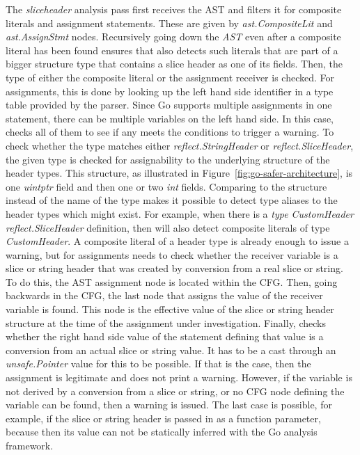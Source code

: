 The \textit{sliceheader} analysis pass first receives the \acrshort{AST} and filters it for composite literals and
assignment statements.
These are given by \textit{ast.CompositeLit} and \textit{ast.AssignStmt} nodes.
Recursively going down the \textit{AST} even after a composite literal has been found ensures that \toolSafer{} also
detects such literals that are part of a bigger structure type that contains a slice header as one of its fields.
Then, the type of either the composite literal or the assignment receiver is checked.
For assignments, this is done by looking up the left hand side identifier in a type table provided by the parser.
Since Go supports multiple assignments in one statement, there can be multiple variables on the left hand side.
In this case, \toolSafer{} checks all of them to see if any meets the conditions to trigger a warning.
To check whether the type matches either \textit{reflect.StringHeader} or \textit{reflect.SliceHeader}, the given type
is checked for assignability to the underlying structure of the header types.
This structure, as illustrated in Figure~\ref{fig:go-safer-architecture}, is one \textit{uintptr} field and then one
or two \textit{int} fields.
Comparing to the structure instead of the name of the type makes it possible to detect type aliases to the header types
which might exist.
For example, when there is a \textit{type CustomHeader reflect.SliceHeader} definition, then \toolSafer{} will also
detect composite literals of type \textit{CustomHeader}.
A composite literal of a header type is already enough to issue a warning, but for assignments \toolSafer{} needs to
check whether the receiver variable is a slice or string header that was created by conversion from a real slice or
string.
To do this, the \acrshort{AST} assignment node is located within the \acrshort{CFG}.
Then, going backwards in the \acrshort{CFG}, the last node that assigns the value of the receiver variable is found.
This node is the effective value of the slice or string header structure at the time of the assignment under
investigation.
Finally, \toolSafer{} checks whether the right hand side value of the statement defining that value is a conversion
from an actual slice or string value.
It has to be a cast through an \textit{unsafe.Pointer} value for this to be possible.
If that is the case, then the assignment is legitimate and \toolSafer{} does not print a warning.
However, if the variable is not derived by a conversion from a slice or string, or no \acrshort{CFG} node defining the
variable can be found, then a warning is issued.
The last case is possible, for example, if the slice or string header is passed in as a function parameter, because then
its value can not be statically inferred with the Go analysis framework.

